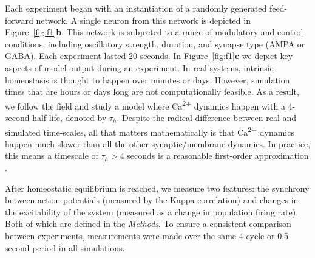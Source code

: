\documentclass{article}
\begin{document}
Each experiment began with an instantiation of a randomly generated feed-forward network. A single neuron from this network is depicted in Figure~\ref{fig:f1}\textbf{b}. This network is subjected to a range of modulatory and control conditions, including oscillatory strength, duration, and synapse type (AMPA or GABA). Each experiment lasted 20 seconds. In Figure~\ref{fig:f1}\textbf{c} we depict key aspects of model output during an experiment. 
In real systems, intrinsic homeostasis is thought to happen over minutes or days. However, simulation times that are hours or days long are not computationally feasible. As a result, we follow the field and study a model where Ca\textsuperscript{2+} dynamics happen with a 4-second half-life, denoted by $\tau_h$. Despite the radical difference between real and simulated time-scales, all that matters mathematically is that Ca\textsuperscript{2+} dynamics happen much slower than all the other synaptic/membrane dynamics. In practice, this means a timescale of $\tau_h > 4$ seconds is a reasonable first-order approximation \cite{Golowasch1999,Marder2014,Marder2015,Gutierrez2013,Marder2014,OLeary2014,LeMasson1993,Abbott1993}.

After homeostatic equilibrium is reached, we measure two features: the synchrony between action potentials (measured by the Kappa correlation) and changes in the excitability of the system (measured as a change in population firing rate). Both of which are defined in the \textit{Methods}. To ensure a consistent comparison between experiments, measurements were made over the same 4-cycle or 0.5 second period in all simulations.

\end{document}

